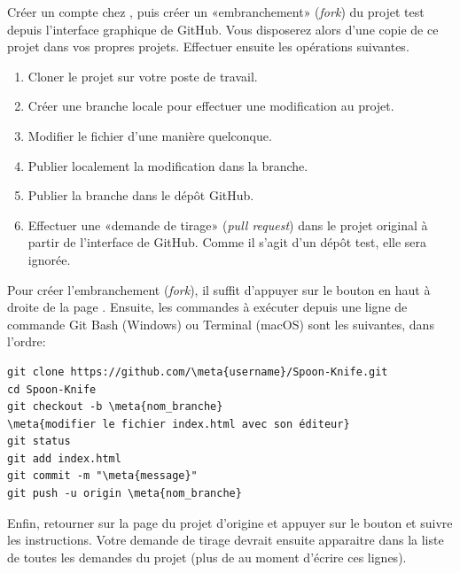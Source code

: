 \begin{exercice}
  Créer un compte chez , puis créer
  un «embranchement» (\emph{fork}) du projet test
   depuis
  l'interface graphique de GitHub. Vous disposerez alors d'une copie
  de ce projet dans vos propres projets. Effectuer ensuite les
  opérations suivantes.
  \begin{enumerate}
  \item Cloner le projet sur votre poste de travail.
  \item Créer une branche locale pour effectuer une modification au
    projet.
  \item Modifier le fichier  d'une manière
    quelconque.
  \item Publier localement la modification dans la branche.
  \item Publier la branche dans le dépôt GitHub.
  \item Effectuer une «demande de tirage» (\emph{pull request}) dans
    le projet original à partir de l'interface de GitHub. Comme il
    s'agit d'un dépôt test, elle sera ignorée.
  \end{enumerate}

  \begin{sol}
    Pour créer l'embranchement (\emph{fork}), il suffit d'appuyer sur
    le bouton  en haut à droite de la page
    .
    Ensuite, les commandes à exécuter depuis une ligne de commande Git
    Bash (Windows) ou Terminal (macOS) sont les suivantes, dans
    l'ordre:
\begin{Schunk}
\begin{Verbatim}[commandchars=\\\{\}]
git clone https://github.com/\meta{username}/Spoon-Knife.git
cd Spoon-Knife
git checkout -b \meta{nom_branche}
\meta{modifier le fichier index.html avec son éditeur}
git status
git add index.html
git commit -m "\meta{message}"
git push -u origin \meta{nom_branche}
\end{Verbatim}
\end{Schunk}
    Enfin, retourner sur la page du projet d'origine et appuyer sur le
    bouton  et suivre les instructions.
    Votre demande de tirage devrait ensuite apparaitre dans la liste
    de toutes les demandes du projet (plus de  au moment
    d'écrire ces lignes).
  \end{sol}
\end{exercice}



